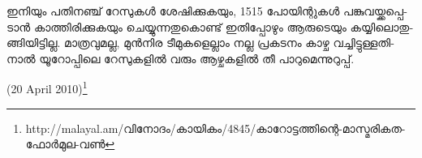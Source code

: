 ഇ­നി­യും പതി­ന­ഞ്ച് റേ­സു­കള്‍ ശേ­ഷി­ക്കു­ക­യും, 1515 പോ­യി­ന്റു­കള്‍ പങ്കു­വ­യ്ക്ക­പ്പെ­ടാന്‍ കാ­ത്തി­രി­ക്കു­ക­യും ചെ­യ്യു­ന്ന­തു­കൊ­ണ്ട് 
ഇതി­പ്പോ­ഴും ആരു­ടെ­യും കയ്യി­ലൊ­തു­ങ്ങി­യി­ട്ടി­ല്ല. മാ­ത്ര­വു­മ­ല്ല, മുന്‍­നിര ടീ­മു­ക­ളെ­ല്ലാം നല്ല പ്ര­ക­ട­നം കാ­ഴ്ച വച്ചി­ട്ടു­ള്ള­തി­നാല്‍ 
യൂ­റോ­പ്പി­ലെ റേ­സു­ക­ളില്‍ വരും ആഴ്ച­ക­ളില്‍ തീ പാ­റു­മെ­ന്നു­റു­പ്പ്. 

(20 April 2010)\footnote{http://malayal.am/വിനോദം/കായികം/4845/കാറോട്ടത്തിന്റെ-മാസ്മരികത-ഫോര്‍മുല-വണ്‍}

\newpage
